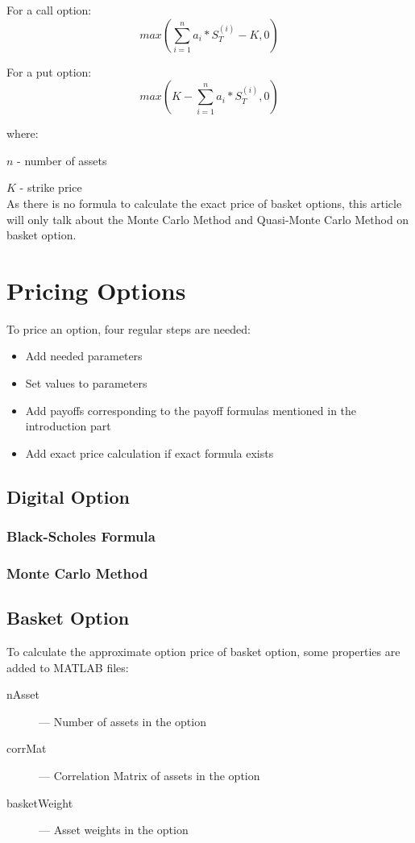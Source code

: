 \documentclass[]{elsarticle}
\theoremstyle{definition}
\theoremstyle{remark}
\begin{document}
For a call option:
\[max(\sum_{i=1}^n {a_i*S_T^{(i)}} - K, 0)\]

For a put option:
 \[max(K - \sum_{i=1}^n {a_i*S_T^{(i)}}, 0)\]
 
 where:
 
 \(n\) - number of assets
 
 \(K\) - strike price\\
 
 
As there is no formula to calculate the exact price of basket options, this article will only talk about the Monte Carlo Method and Quasi-Monte Carlo Method on basket option.

\section{Pricing Options}
To price an option, four regular steps are needed:
\begin{itemize}
\item Add needed parameters 
\item Set values to parameters
\item Add payoffs corresponding to the payoff formulas mentioned in the introduction part
\item Add exact price calculation if exact formula exists
\end{itemize}
\subsection{Digital Option}

\subsubsection{Black-Scholes Formula }

\subsubsection{Monte Carlo Method}

\subsection{Basket Option}
To calculate the approximate option price of basket option, some properties are added to MATLAB files:
\begin{description}
\item[nAsset]--- Number of assets in the option
\item[corrMat]--- Correlation Matrix of assets in the option
\item[basketWeight]--- Asset weights in the option 
\end{description}
\end{document}
